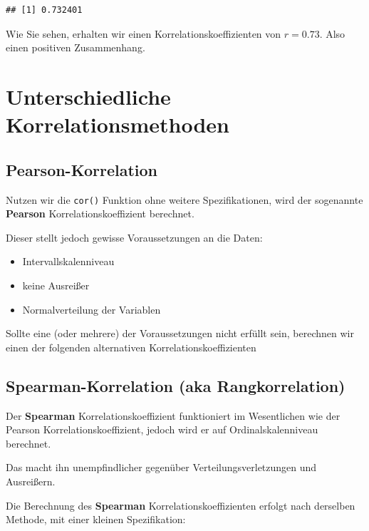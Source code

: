\documentclass[
]{book}
\providecommand{\tightlist}{%
  \setlength{\itemsep}{0pt}\setlength{\parskip}{0pt}}
\begin{document}
\begin{verbatim}
## [1] 0.732401
\end{verbatim}

Wie Sie sehen, erhalten wir einen Korrelationskoeffizienten von \(r=0.73\). Also einen positiven Zusammenhang.

\hypertarget{unterschiedliche-korrelationsmethoden}{%
\section{Unterschiedliche Korrelationsmethoden}\label{unterschiedliche-korrelationsmethoden}}

\hypertarget{pearson-korrelation}{%
\subsection{Pearson-Korrelation}\label{pearson-korrelation}}

Nutzen wir die \texttt{cor()} Funktion ohne weitere Spezifikationen, wird der sogenannte \textbf{Pearson} Korrelationskoeffizient berechnet.

Dieser stellt jedoch gewisse Voraussetzungen an die Daten:

\begin{itemize}
\tightlist
\item
  Intervallskalenniveau
\item
  keine Ausreißer
\item
  Normalverteilung der Variablen
\end{itemize}

Sollte eine (oder mehrere) der Voraussetzungen nicht erfüllt sein, berechnen wir einen der folgenden alternativen Korrelationskoeffizienten

\hypertarget{spearman-korrelation-aka-rangkorrelation}{%
\subsection{Spearman-Korrelation (aka Rangkorrelation)}\label{spearman-korrelation-aka-rangkorrelation}}

Der \textbf{Spearman} Korrelationskoeffizient funktioniert im Wesentlichen wie der Pearson Korrelationskoeffizient, jedoch wird er auf Ordinalskalenniveau berechnet.

Das macht ihn unempfindlicher gegenüber Verteilungsverletzungen und Ausreißern.

Die Berechnung des \textbf{Spearman} Korrelationskoeffizienten erfolgt nach derselben Methode, mit einer kleinen Spezifikation:
\end{document}
